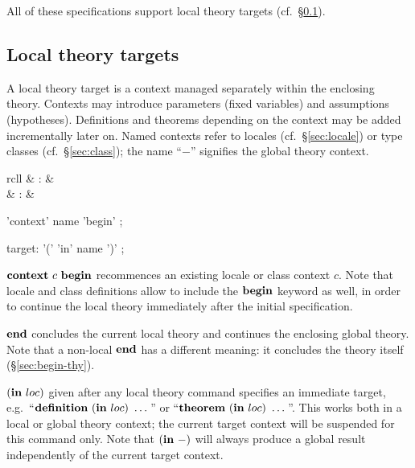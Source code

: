 All of these specifications support local theory targets (cf.\ 
\S\ref{sec:target}).


\subsection{Local theory targets}\label{sec:target}

A local theory target is a context managed separately within the
enclosing theory.  Contexts may introduce parameters (fixed variables)
and assumptions (hypotheses).  Definitions and theorems depending on
the context may be added incrementally later on.  Named contexts refer
to locales (cf.\ \S\ref{sec:locale}) or type classes (cf.\ 
\S\ref{sec:class}); the name ``$-$'' signifies the global theory
context.

\begin{matharray}{rcll}
  \isarcmd{context} & : &  \\
  \isarcmd{end} & : &  \\
\end{matharray}

\begin{rail}
  'context' name 'begin'
  ;

  target: '(' 'in' name ')'
  ;
\end{rail}

\begin{descr}
  
\item ${\mathord{\mathbf{context}}}~c~{\mathord{\mathbf{begin}}}$ recommences an
  existing locale or class context $c$.  Note that locale and class
  definitions allow to include the ${\mathord{\mathbf{begin}}}$ keyword as
  well, in order to continue the local theory immediately after the
  initial specification.
  
\item ${\mathord{\mathbf{end}}}$ concludes the current local theory and continues the
  enclosing global theory.  Note that a non-local ${\mathord{\mathbf{end}}}$ has a
  different meaning: it concludes the theory itself
  (\S\ref{sec:begin-thy}).
  
\item $({\mathord{\mathbf{in}}}~loc)$ given after any local theory command specifies an
  immediate target, e.g.\ 
  ``${\mathord{\mathbf{definition}}}~({\mathord{\mathbf{in}}}~loc)~\dots$'' or
  ``${\mathord{\mathbf{theorem}}}~({\mathord{\mathbf{in}}}~loc)~\dots$''.  This works both in a local or
  global theory context; the current target context will be suspended
  for this command only.  Note that $({\mathord{\mathbf{in}}}~-)$ will always produce a
  global result independently of the current target context.

\end{descr}

